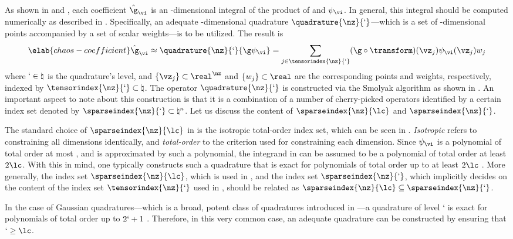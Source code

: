 As shown in  and , each
coefficient $\hat{\g}_{\vi}$ is an \nz-dimensional integral of the product of \g
and $\psi_{\vi}$. In general, this integral should be computed numerically as
described in . Specifically, an adequate
\nz-dimensional quadrature $\quadrature{\nz}{\lq}$---which is a set of
\nz-dimensional points accompanied by a set of scalar weights---is to be
utilized. The result is
\begin{equation} \elab{chaos-coefficient}
  \hat{\g}_{\vi} \approx \quadrature{\nz}{\lq}{\g \psi_{\vi}}
  = \sum_{j \in \tensorindex{\nz}{\lq}} (\g \circ \transform)(\vz_j) \psi_{\vi}(\vz_j) w_j
\end{equation}
where $\lq \in \natural$ is the quadrature's level, and $\{ \vz_j \} \subset
\real^\nz$ and $\{ w_j \} \subset \real$ are the corresponding points and
weights, respectively, indexed by $\tensorindex{\nz}{\lq} \subset \natural$. The
operator $\quadrature{\nz}{\lq}$ is constructed via the Smolyak algorithm
\cite{smolyak1963} as shown in . An important aspect to
note about this construction is that it is a combination of a number of
cherry-picked operators identified by a certain index set denoted by
$\sparseindex{\nz}{\lq} \subset \natural^n$. Let us discuss the content of
$\sparseindex{\nz}{\lc}$ and $\sparseindex{\nz}{\lq}$.

The standard choice of $\sparseindex{\nz}{\lc}$ in  is the
isotropic total-order index set, which can be seen in
. \emph{Isotropic} refers to constraining all
dimensions identically, and \emph{total-order} to the criterion used for
constraining each dimension. Since $\psi_{\vi}$ is a polynomial of total order
at most \lc, and \g is approximated by such a polynomial, the integrand in
 can be assumed to be a polynomial of total order at
least $2 \lc$. With this in mind, one typically constructs such a quadrature
that is exact for polynomials of total order up to at least $2 \lc$
\cite{eldred2008}. More generally, the index set $\sparseindex{\nz}{\lc}$, which
is used in , and the index set $\sparseindex{\nz}{\lq}$,
which implicitly decides on the content of the index set
$\tensorindex{\nz}{\lq}$ used in , should be related as
$\sparseindex{\nz}{\lc} \subseteq \sparseindex{\nz}{\lq}$.

In the case of Gaussian quadratures---which is a broad, potent class of
quadratures introduced in ---a quadrature of level \lq
is exact for polynomials of total order up to $2 \lq + 1$ \cite{heiss2008}.
Therefore, in this very common case, an adequate quadrature can be constructed
by ensuring that $\lq \geq \lc$.

